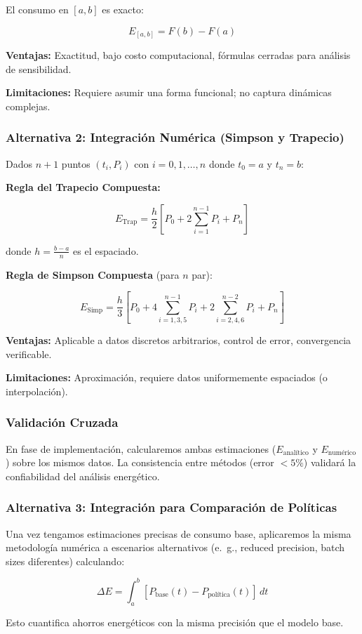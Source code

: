 El consumo en $[a,b]$ es exacto:

\begin{equation}
E_{[a,b]} = F(b) - F(a)
\end{equation}

\textbf{Ventajas:} Exactitud, bajo costo computacional, fórmulas cerradas para análisis de sensibilidad.

\textbf{Limitaciones:} Requiere asumir una forma funcional; no captura dinámicas complejas.

\subsubsection*{Alternativa 2: Integración Numérica (Simpson y Trapecio)}

Dados $n+1$ puntos $(t_i, P_i)$ con $i = 0, 1, \ldots, n$ donde $t_0 = a$ y $t_n = b$:

\textbf{Regla del Trapecio Compuesta:}

\begin{equation}
E_{\text{Trap}} = \frac{h}{2} \left[ P_0 + 2\sum_{i=1}^{n-1} P_i + P_n \right]
\end{equation}

donde $h = \frac{b-a}{n}$ es el espaciado.

\textbf{Regla de Simpson Compuesta} (para $n$ par):

\begin{equation}
E_{\text{Simp}} = \frac{h}{3} \left[ P_0 + 4\sum_{i=1,3,5}^{n-1} P_i + 2\sum_{i=2,4,6}^{n-2} P_i + P_n \right]
\end{equation}

\textbf{Ventajas:} Aplicable a datos discretos arbitrarios, control de error, convergencia verificable.

\textbf{Limitaciones:} Aproximación, requiere datos uniformemente espaciados (o interpolación).

\subsubsection*{Validación Cruzada}

En fase de implementación, calcularemos ambas estimaciones ($E_{\text{analítico}}$ y $E_{\text{numérico}}$) sobre los mismos datos. La consistencia entre métodos (error $< 5\%$) validará la confiabilidad del análisis energético.

\subsubsection*{Alternativa 3: Integración para Comparación de Políticas}

Una vez tengamos estimaciones precisas de consumo base, aplicaremos la misma metodología numérica a escenarios alternativos (e.~g., reduced precision, batch sizes diferentes) calculando:

\begin{equation}
\Delta E = \int_a^b [P_{\text{base}}(t) - P_{\text{política}}(t)]\,dt
\end{equation}

Esto cuantifica ahorros energéticos con la misma precisión que el modelo base.
